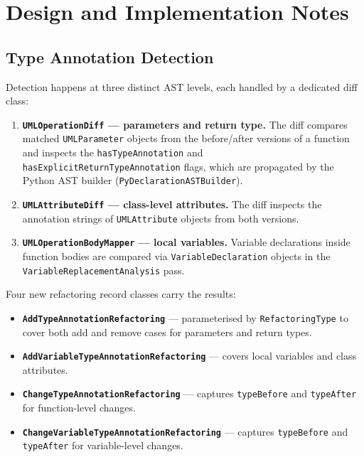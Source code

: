 \documentclass[11pt,a4paper]{article}
\newcommand{\code}[1]{\texttt{#1}}
\begin{document}
\section{Design and Implementation Notes}

\subsection{Type Annotation Detection}

Detection happens at three distinct AST levels, each handled by a dedicated diff class:

\begin{enumerate}[leftmargin=*, label=\arabic*.]
  \item \textbf{\code{UMLOperationDiff} --- parameters and return type.}
        The diff compares matched \code{UMLParameter} objects from the before/after versions of a function and inspects the \code{hasTypeAnnotation} and \code{hasExplicitReturnTypeAnnotation} flags, which are propagated by the Python AST builder (\code{PyDeclarationASTBuilder}).

  \item \textbf{\code{UMLAttributeDiff} --- class-level attributes.}
        The diff inspects the annotation strings of \code{UMLAttribute} objects from both versions.

  \item \textbf{\code{UMLOperationBodyMapper} --- local variables.}
        Variable declarations inside function bodies are compared via \code{VariableDeclaration} objects in the \code{VariableReplacementAnalysis} pass.
\end{enumerate}

Four new refactoring record classes carry the results:

\begin{itemize}[leftmargin=*]
  \item \textbf{\code{AddTypeAnnotationRefactoring}} --- parameterised by \code{RefactoringType} to cover both add and remove cases for parameters and return types.
  \item \textbf{\code{AddVariableTypeAnnotationRefactoring}} --- covers local variables and class attributes.
  \item \textbf{\code{ChangeTypeAnnotationRefactoring}} --- captures \code{typeBefore} and \code{typeAfter} for function-level changes.
  \item \textbf{\code{ChangeVariableTypeAnnotationRefactoring}} --- captures \code{typeBefore} and \code{typeAfter} for variable-level changes.
\end{itemize}
\end{document}

